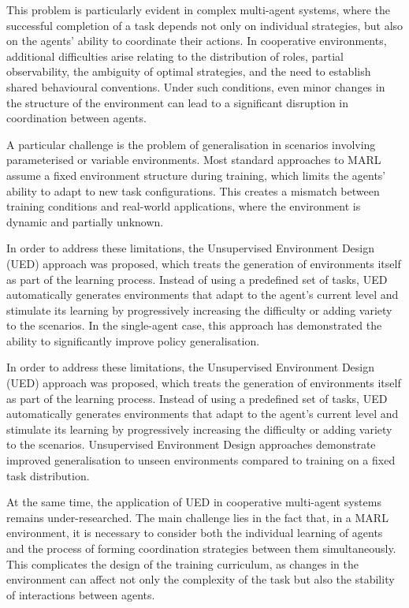 This problem is particularly evident in complex multi-agent systems, where the successful completion of a task depends not only on individual strategies, but also on the agents’ ability to coordinate their actions. In cooperative environments, additional difficulties arise relating to the distribution of roles, partial observability, the ambiguity of optimal strategies, and the need to establish shared behavioural conventions. Under such conditions, even minor changes in the structure of the environment can lead to a significant disruption in coordination between agents.

A particular challenge is the problem of generalisation in scenarios involving parameterised or variable environments. Most standard approaches to MARL assume a fixed environment structure during training, which limits the agents’ ability to adapt to new task configurations. This creates a mismatch between training conditions and real-world applications, where the environment is dynamic and partially unknown.

In order to address these limitations, the Unsupervised Environment Design (UED) approach was proposed, which treats the generation of environments itself as part of the learning process. Instead of using a predefined set of tasks, UED automatically generates environments that adapt to the agent’s current level and stimulate its learning by progressively increasing the difficulty or adding variety to the scenarios. In the single-agent case, this approach has demonstrated the ability to significantly improve policy generalisation.

In order to address these limitations, the Unsupervised Environment Design (UED) approach was proposed, which treats the generation of environments itself as part of the learning process. Instead of using a predefined set of tasks, UED automatically generates environments that adapt to the agent’s current level and stimulate its learning by progressively increasing the difficulty or adding variety to the scenarios. Unsupervised Environment Design approaches demonstrate improved generalisation to unseen environments compared to training on a fixed task distribution. \cite{dennis2020}

At the same time, the application of UED in cooperative multi-agent systems remains under-researched. The main challenge lies in the fact that, in a MARL environment, it is necessary to consider both the individual learning of agents and the process of forming coordination strategies between them simultaneously. This complicates the design of the training curriculum, as changes in the environment can affect not only the complexity of the task but also the stability of interactions between agents.

